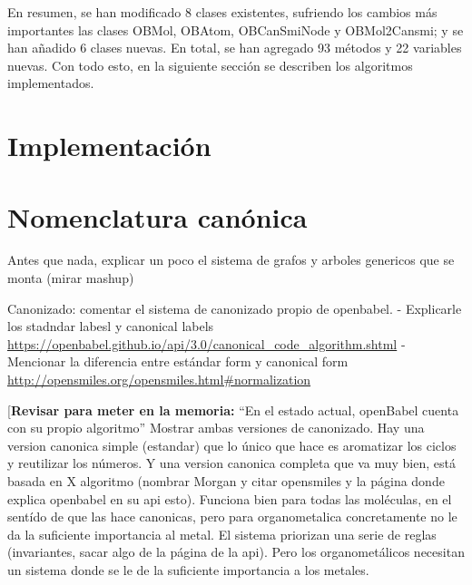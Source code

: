En resumen, se han modificado 8 clases existentes, sufriendo los cambios más importantes las clases OBMol, OBAtom, OBCanSmiNode y OBMol2Cansmi; y se han añadido 6 clases nuevas. En total, se han agregado 93 métodos y 22 variables nuevas. Con todo esto, en la siguiente sección se describen los algoritmos implementados.

\section{Implementación}

\section{Nomenclatura canónica} \label{canonizacion} \label{implementacion:canonizado}

Antes que nada, explicar un poco el sistema de grafos y arboles genericos que se monta (mirar mashup)

Canonizado: comentar el sistema de canonizado propio de openbabel. 
- Explicarle los stadndar labesl y canonical labels \url{https://openbabel.github.io/api/3.0/canonical_code_algorithm.shtml}
- Mencionar la diferencia entre estándar form y canonical form \url{http://opensmiles.org/opensmiles.html#normalization}


[\textbf{Revisar para meter en la memoria:}
“En el estado actual, openBabel cuenta con su propio algoritmo”
Mostrar ambas versiones de canonizado. Hay una version canonica simple (estandar) que lo único que hace es aromatizar los ciclos y reutilizar los números. Y una version canonica completa que va muy bien, está basada en X algoritmo (nombrar Morgan y citar opensmiles y la página donde explica openbabel en su api esto). Funciona bien para todas las moléculas, en el sentído de que las hace canonicas, pero para organometalica concretamente no le da la suficiente importancia al metal. El sistema priorizan una serie de reglas (invariantes, sacar algo de la página de la api). Pero los organometálicos necesitan un sistema donde se le de la suficiente importancia a los metales.

